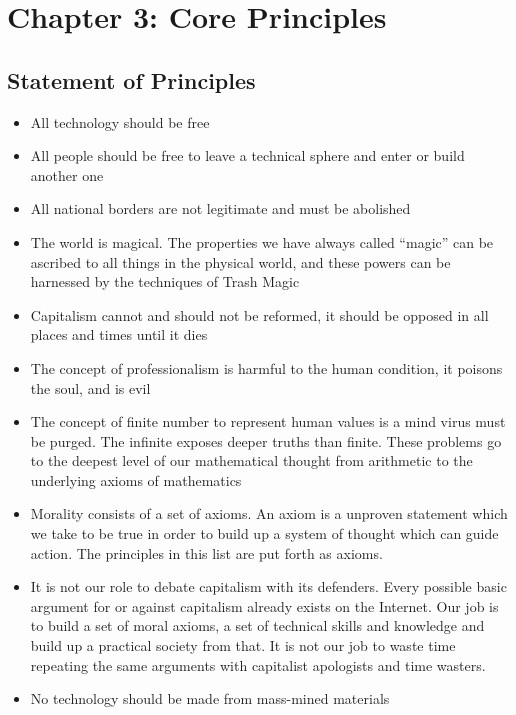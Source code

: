 \section{Chapter 3: Core Principles}\label{chapter-3-core-principles}

\subsection{Statement of Principles}\label{statement-of-principles}

\begin{itemize}
\tightlist
\item
  All technology should be free
\item
  All people should be free to leave a technical sphere and enter or
  build another one
\item
  All national borders are not legitimate and must be abolished
\item
  The world is magical. The properties we have always called ``magic''
  can be ascribed to all things in the physical world, and these powers
  can be harnessed by the techniques of Trash Magic
\item
  Capitalism cannot and should not be reformed, it should be opposed in
  all places and times until it dies
\item
  The concept of professionalism is harmful to the human condition, it
  poisons the soul, and is evil\\
\item
  The concept of finite number to represent human values is a mind virus
  must be purged. The infinite exposes deeper truths than finite. These
  problems go to the deepest level of our mathematical thought from
  arithmetic to the underlying axioms of mathematics
\item
  Morality consists of a set of axioms. An axiom is a unproven statement
  which we take to be true in order to build up a system of thought
  which can guide action. The principles in this list are put forth as
  axioms.
\item
  It is not our role to debate capitalism with its defenders. Every
  possible basic argument for or against capitalism already exists on
  the Internet. Our job is to build a set of moral axioms, a set of
  technical skills and knowledge and build up a practical society from
  that. It is not our job to waste time repeating the same arguments
  with capitalist apologists and time wasters.
\item
  No technology should be made from mass-mined materials

\end{itemize}

